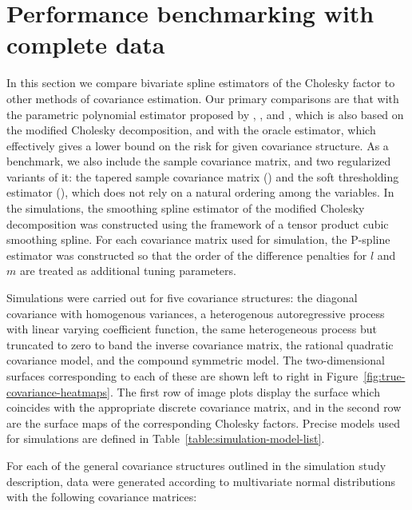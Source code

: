 \section{Performance benchmarking with complete data}

In this section we compare bivariate spline estimators of the Cholesky factor to other methods of covariance estimation. Our primary comparisons are that with the parametric polynomial estimator proposed by \cite{pourahmadi1999joint},  \cite{pan2003modelling}, and \cite{pourahmadi2002dynamic}, which is also based on the modified Cholesky decomposition, and with the oracle estimator, which effectively gives a lower bound on the risk for given covariance structure. As a benchmark, we also include the sample covariance matrix, and two regularized variants of it: the tapered sample covariance matrix (\cite{cai2010optimal}) and the soft thresholding estimator (\cite{rothman2009generalized}), which does not rely on a natural ordering among the variables. In the simulations, the smoothing spline estimator of the modified Cholesky decomposition was constructed using the framework of a tensor product cubic smoothing spline. For each covariance matrix used for simulation, the P-spline estimator was constructed so that the order of the difference penalties for $l$ and $m$ are treated as additional tuning parameters.

\bigskip

Simulations were carried out for five covariance structures: the diagonal covariance with homogenous variances, a heterogenous autoregressive process with linear varying coefficient function, the same heterogeneous process but truncated to zero to band the inverse covariance matrix, the rational quadratic covariance model, and the compound symmetric model. The two-dimensional surfaces corresponding to each of these are shown left to right in Figure~\ref{fig:true-covariance-heatmaps}. The first row of image plots display the surface which coincides with the appropriate discrete covariance matrix, and in the second row are the surface maps of the corresponding Cholesky factors. Precise models used for simulations are defined in Table~\ref{table:simulation-model-list}. 


For each of the general covariance structures outlined in the simulation study description, data were generated according to multivariate normal distributions with the following covariance matrices: 


